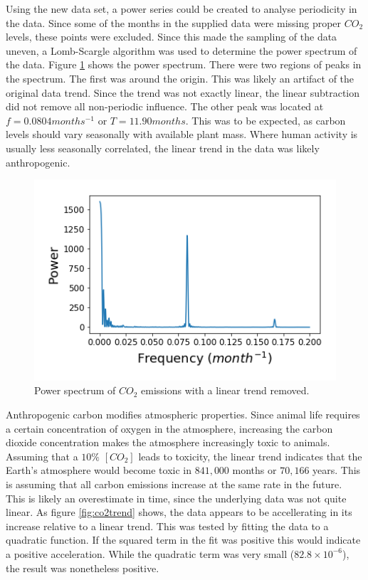 \documentclass[twocolumn]{article}
\begin{document}
Using the new data set, a power series could be created to analyse periodicity in the data. Since some of the months in the supplied data were missing proper $CO_2$ levels, these points were excluded. Since this made the sampling of the data uneven, a Lomb-Scargle algorithm was used to determine the power spectrum of the data. Figure \ref{fig:co2power} shows the power spectrum. There were two regions of peaks in the spectrum. The first was around the origin. This was likely an artifact of the original data trend. Since the trend was not exactly linear, the linear subtraction did not remove all non-periodic influence. The other peak was located at $f=0.0804 months^{-1}$ or $T=11.90 months$. This was to be expected, as carbon levels should vary seasonally with available plant mass. Where human activity is usually less seasonally correlated, the linear trend in the data was likely anthropogenic.

\begin{figure}
\centering
\includegraphics[width=\linewidth]{co2power}
\caption{Power spectrum of $CO_2$ emissions with a linear trend removed.}
\label{fig:co2power}
\end{figure}

Anthropogenic carbon modifies atmospheric properties. Since animal life requires a certain concentration of oxygen in the atmosphere, increasing the carbon dioxide concentration makes the atmosphere increasingly toxic to animals. Assuming that a $10\%$ $[CO_2]$ leads to toxicity, the linear trend indicates that the Earth's atmosphere would become toxic in $841,000$ months or $70,166$ years. This is assuming that all carbon emissions increase at the same rate in the future. This is likely an overestimate in time, since the underlying data was not quite linear. As figure \ref{fig:co2trend} shows, the data appears to be accellerating in its increase relative to a linear trend. This was tested by fitting the data to a quadratic function. If the squared term in the fit was positive this would indicate a positive acceleration. While the quadratic term was very small ($82.8 \times 10^{-6}$), the result was nonetheless positive. 
\end{document}
